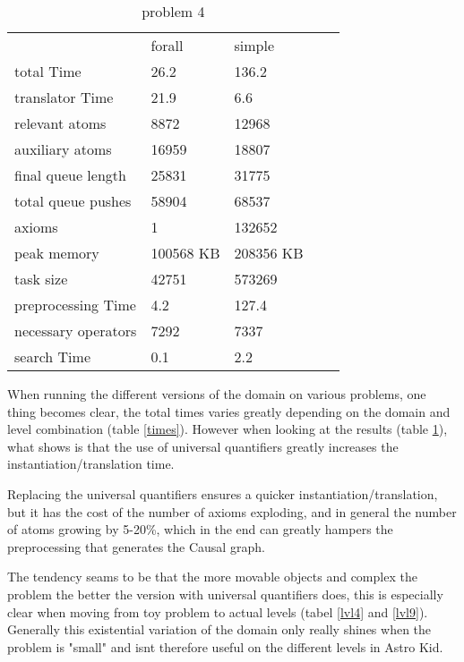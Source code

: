 			\begin{table}[h]
				\centering
				\caption{problem 4}
				\label{prob4}
				\begin{tabular}{lllll}
					& forall & simple  \\
					total Time & 26.2 & 136.2 \\
					translator Time& 21.9 & 6.6 \\
					
					
					relevant atoms & 8872 & 12968\\
					auxiliary atoms & 16959& 18807\\
					final queue length &25831 & 31775\\
					total queue pushes &58904 & 68537\\
					axioms & 1 & 132652 \\ 
					peak memory & 100568 KB & 208356 KB\\ 
					task size & 42751 & 573269\\
					
					
					preprocessing Time& 4.2 & 127.4 \\
					necessary operators & 7292 & 7337\\
					
					
					search Time & 0.1 & 2.2 \\
				\end{tabular}
			\end{table}
			When running the different versions of the domain on various problems, one thing becomes clear, the total times varies greatly depending on the domain and level combination (table \ref{times}). However when looking at the results (table \ref{prob4}), what shows is that the use of universal quantifiers greatly increases the instantiation/translation time. 
			
			Replacing the universal quantifiers ensures a quicker instantiation/translation, but it has the cost of the number of axioms exploding, and in general the number of atoms growing by 5-20\%, which in the end can greatly hampers the preprocessing that generates the Causal graph.
			
			The tendency seams to be that the more movable objects and complex the problem the better the version with universal quantifiers does, this is especially clear when moving from toy problem to actual levels (tabel \ref{lvl4} and \ref{lvl9}). Generally this existential variation of the domain only really shines when the problem is "small" and isnt therefore useful on the different levels in Astro Kid.
			

